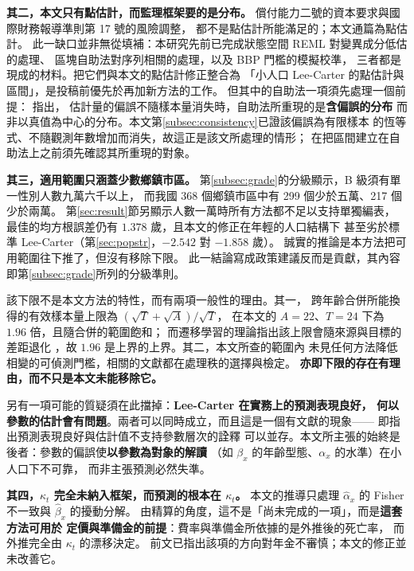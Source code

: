 \documentclass[UTF8, fontset=macnew, a4paper, 12pt]{ctexart}
\begin{document}
\textbf{其二，本文只有點估計，而監理框架要的是分布。}
償付能力二號的資本要求與國際財務報導準則第 17 號的風險調整，
都不是點估計所能滿足的；本文通篇為點估計。
此一缺口並非無從填補：本研究先前已完成狀態空間 REML 對變異成分低估的處理、
區塊自助法對序列相關的處理，以及 BBP 門檻的模擬校準，
三者都是現成的材料。把它們與本文的點估計修正整合為
「小人口 Lee-Carter 的點估計與區間」，是投稿前優先於再加新方法的工作。
但其中的自助法一項須先處理一個前提：\citet{cavaliere2024} 指出，
估計量的偏誤不隨樣本量消失時，自助法所重現的是\textbf{含偏誤的分布}
而非以真值為中心的分布。本文第\ref{subsec:consistency}已證該偏誤為有限樣本
的恆等式、不隨觀測年數增加而消失，故這正是該文所處理的情形；
在把區間建立在自助法上之前須先確認其所重現的對象。

\textbf{其三，適用範圍只涵蓋少數鄉鎮市區。}
第\ref{subsec:grade}的分級顯示，B 級須有單一性別人數九萬六千以上，
而我國 368 個鄉鎮市區中有 299 個少於五萬、217 個少於兩萬。
第\ref{sec:result}節另顯示人數一萬時所有方法都不足以支持單獨編表，
最佳的均方根誤差仍有 $1.378$ 歲，且本文的修正在年輕的人口結構下
甚至劣於標準 Lee-Carter（第\ref{sec:popstr}，$-2.542$ 對 $-1.858$ 歲）。
誠實的推論是本方法把可用範圍往下推了，但沒有移除下限。
此一結論寫成政策建議反而是貢獻，其內容即第\ref{subsec:grade}所列的分級準則。

該下限不是本文方法的特性，而有兩項一般性的理由。其一，
跨年齡合併所能換得的有效樣本量上限為 $(\sqrt T+\sqrt A)/\sqrt T$，
在本文的 $A=22$、$T=24$ 下為 $1.96$ 倍，且隨合併的範圍飽和；
而遷移學習的理論指出該上限會隨來源與目標的差距退化
\citep{reeve2021}，故 $1.96$ 是上界的上界。其二，本文所查的範圍內
未見任何方法降低相變的可偵測門檻，相關的文獻都在處理秩的選擇與檢定。
\textbf{亦即下限的存在有理由，而不只是本文未能移除它。}

另有一項可能的質疑須在此擋掉：\textbf{Lee-Carter 在實務上的預測表現良好，
何以參數的估計會有問題}。兩者可以同時成立，而且這是一個有文獻的現象——
\citet{bratsberg2026} 即指出預測表現良好與估計值不支持參數層次的詮釋
可以並存。本文所主張的始終是後者：參數的偏誤使\textbf{以參數為對象的解讀}
（如 $\beta_x$ 的年齡型態、$\alpha_x$ 的水準）在小人口下不可靠，
而非主張預測必然失準。

\textbf{其四，$\kappa_t$ 完全未納入框架，而預測的根本在 $\kappa_t$。}
本文的推導只處理 $\hat\alpha_x$ 的 Fisher 不一致與 $\hat\beta_x$ 的擾動分解。
由精算的角度，這不是「尚未完成的一項」，而是\textbf{這套方法可用於
定價與準備金的前提}：費率與準備金所依據的是外推後的死亡率，
而外推完全由 $\kappa_t$ 的漂移決定。
前文已指出該項的方向對年金不審慎；本文的修正並未改善它。
\end{document}
